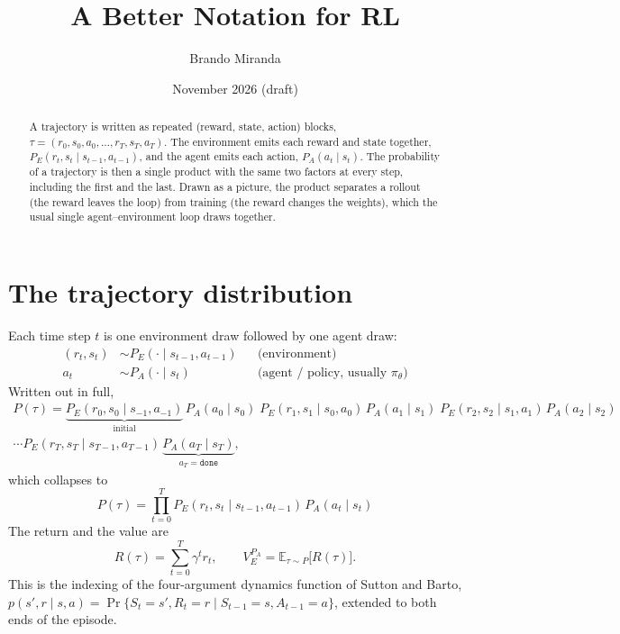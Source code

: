 \documentclass[11pt]{article}
\title{A Better Notation for RL}
\author{Brando Miranda}
\date{November 2026 (draft)}
\newcommand{\done}{\texttt{done}}
\begin{document}
\maketitle

\begin{abstract}
A trajectory is written as repeated (reward, state, action) blocks,
$\tau = (r_0, s_0, a_0, \ldots, r_T, s_T, a_T)$. The environment emits each
reward and state together, $P_E(r_t, s_t \mid s_{t-1}, a_{t-1})$, and the agent
emits each action, $P_A(a_t \mid s_t)$. The probability of a trajectory is then
a single product with the same two factors at every step, including the first
and the last. Drawn as a picture, the product separates a rollout (the reward
leaves the loop) from training (the reward changes the weights), which the
usual single agent--environment loop draws together.
\end{abstract}

\section{The trajectory distribution}

Each time step $t$ is one environment draw followed by one agent draw:
\begin{align*}
(r_t, s_t) &\sim P_E(\cdot \mid s_{t-1}, a_{t-1}) && \text{(environment)}\\
a_t &\sim P_A(\cdot \mid s_t) && \text{(agent / policy, usually } \pi_\theta\text{)}
\end{align*}
Written out in full,
\begin{multline*}
P(\tau) = \underbrace{P_E(r_0, s_0 \mid s_{-1}, a_{-1})}_{\text{initial}}\, P_A(a_0 \mid s_0)\;
P_E(r_1, s_1 \mid s_0, a_0)\, P_A(a_1 \mid s_1)\;
P_E(r_2, s_2 \mid s_1, a_1)\, P_A(a_2 \mid s_2) \\
\cdots P_E(r_T, s_T \mid s_{T-1}, a_{T-1})\, \underbrace{P_A(a_T \mid s_T)}_{a_T = \done},
\end{multline*}
which collapses to
\begin{equation}
\boxed{\;P(\tau) = \prod_{t=0}^{T} P_E(r_t, s_t \mid s_{t-1}, a_{t-1})\, P_A(a_t \mid s_t)\;}
\label{eq:traj}
\end{equation}
The return and the value are
\[
R(\tau) = \sum_{t=0}^{T} \gamma^t r_t, \qquad V_E^{P_A} = \mathbb{E}_{\tau \sim P}\big[R(\tau)\big].
\]
This is the indexing of the four-argument dynamics function of Sutton and Barto,
$p(s', r \mid s, a) = \Pr\{S_t = s', R_t = r \mid S_{t-1} = s, A_{t-1} = a\}$,
extended to both ends of the episode.
\end{document}
